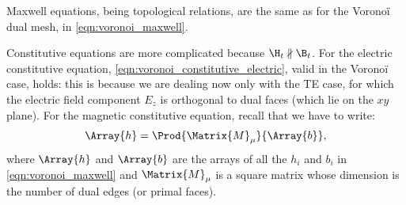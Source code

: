 Maxwell equations, being topological relations, are the same as for
the Vorono\"i dual mesh, in \eqref{eqn:voronoi_maxwell}.

Constitutive equations are more complicated because $\H_t \nparallel
\B_t$. For the electric constitutive equation,
\eqref{eqn:voronoi_constitutive_electric}, valid in the Vorono\"i
case, holds: this is because we are dealing now only with the TE case,
for which the electric field component $E_z$ is orthogonal to dual
faces (which lie on the $xy$ plane). For the magnetic constitutive
equation, recall that we have to write:
\begin{equation*}
  \Array{h} = \Prod{\Matrix{M}_\mu}{\Array{b}} ,
\end{equation*}
where $\Array{h}$ and $\Array{b}$ are the arrays of all the $h_i$ and
$b_i$ in \eqref{eqn:voronoi_maxwell} and $\Matrix{M}_\mu$ is a square
matrix whose dimension is the number of dual edges (or primal faces).

